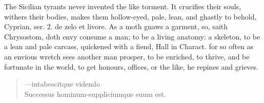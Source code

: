 {The Sicilian tyrants never invented the like torment. It crucifies
their souls, withers their bodies, makes them hollow-eyed, pale,
lean, and ghastly to behold, Cyprian, ser. 2. de zelo et livore.
As a moth gnaws a garment, so, saith Chrysostom, doth envy
consume a man; to be a living anatomy: a skeleton, to be a lean and
pale carcass, quickened with a fiend, Hall in Charact. for
so often as an envious wretch sees another man prosper, to be enriched,
to thrive, and be fortunate in the world, to get honours, offices, or
the like, he repines and grieves.

\begin{verse}
---\textlatin{intabescitque videndo\\
  Successus hominum-suppliciumque suum est.}
\end{verse}

}
